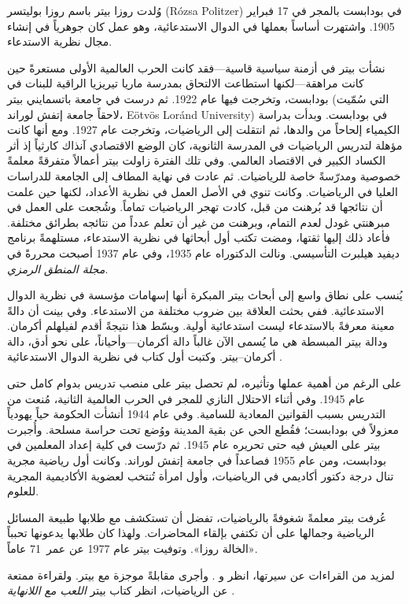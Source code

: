 \documentclass[../../../include/open-logic-section]{subfiles}
\begin{document}



وُلدت روزا بيتر باسم روزا بوليتسر (R\'ozsa Politzer) في بودابست بالمجر
في 17 فبراير 1905. واشتهرت أساساً بعملها في الدوال الاستدعائية، وهو عمل
كان جوهرياً في إنشاء مجال نظرية الاستدعاء.

نشأت بيتر في أزمنة سياسية قاسية---فقد كانت الحرب العالمية الأولى مستعرةً
حين كانت مراهقة---لكنها استطاعت الالتحاق بمدرسة ماريا تيريزيا الراقية
للبنات في بودابست، وتخرجت فيها عام 1922. ثم درست في جامعة باتسمايني بيتر
(التي سُمّيت لاحقاً جامعة إتفش لوراند، E\"otv\"os Lor\'and University)
في بودابست. وبدأت بدراسة الكيمياء إلحاحاً من والدها، ثم انتقلت إلى
الرياضيات، وتخرجت عام 1927. ومع أنها كانت مؤهلة لتدريس الرياضيات في
المدرسة الثانوية، كان الوضع الاقتصادي آنذاك كارثياً إذ أثر الكساد الكبير
في الاقتصاد العالمي. وفي تلك الفترة زاولت بيتر أعمالاً متفرقةً معلمةً
خصوصية ومدرّسةً خاصة للرياضيات. ثم عادت في نهاية المطاف إلى الجامعة
للدراسات العليا في الرياضيات. وكانت تنوي في الأصل العمل في نظرية الأعداد،
لكنها حين علمت أن نتائجها قد بُرهنت من قبل، كادت تهجر الرياضيات تماماً.
وشُجعت على العمل في مبرهنتي غودل لعدم التمام، وبرهنت من غير أن تعلم عدداً
من نتائجه بطرائق مختلفة. فأعاد ذلك إليها ثقتها، ومضت تكتب أول أبحاثها في
نظرية الاستدعاء، مستلهمةً برنامج ديفيد هيلبرت التأسيسي. ونالت الدكتوراه
عام 1935، وفي عام 1937 أصبحت محررةً في \emph{مجلة المنطق الرمزي}.

يُنسب على نطاق واسع إلى أبحاث بيتر المبكرة أنها إسهامات مؤسسة في نظرية
الدوال الاستدعائية. ففي \cite{Peter1935a} بحثت العلاقة بين ضروب مختلفة
من الاستدعاء. وفي \cite{Peter1935b} بينت أن دالةً معينة معرفةً بالاستدعاء
ليست استدعائية أولية. وبسّط هذا نتيجةً أقدم لفيلهلم أكرمان. ودالة بيتر
المبسطة هي ما يُسمى الآن غالباً دالة أكرمان---وأحياناً، على نحو أدق، دالة
أكرمان--بيتر. وكتبت أول كتاب في نظرية الدوال الاستدعائية
\citep{Peter1951}.

على الرغم من أهمية عملها وتأثيره، لم تحصل بيتر على منصب تدريس بدوام كامل
حتى عام 1945. وفي أثناء الاحتلال النازي للمجر في الحرب العالمية الثانية،
مُنعت من التدريس بسبب القوانين المعادية للسامية. وفي عام 1944 أنشأت
الحكومة حياً يهودياً معزولاً في بودابست؛ فقُطع الحي عن بقية المدينة ووُضع
تحت حراسة مسلحة. وأُجبرت بيتر على العيش فيه حتى تحريره عام 1945. ثم درّست
في كلية إعداد المعلمين في بودابست، ومن عام 1955 فصاعداً في جامعة إتفش
لوراند. وكانت أول رياضية مجرية تنال درجة دكتور أكاديمي في الرياضيات، وأول
امرأة تُنتخب لعضوية الأكاديمية المجرية للعلوم.

عُرفت بيتر معلمةً شغوفةً بالرياضيات، تفضل أن تستكشف مع طلابها طبيعة
المسائل الرياضية وجمالها على أن تكتفي بإلقاء المحاضرات. ولهذا كان طلابها
يدعونها تحبباً «الخالة روزا». وتوفيت بيتر عام 1977 عن عمر~71 عاماً.

\begin{reading}
لمزيد من القراءات عن سيرتها، انظر \citep{Oconnor2014} و
\citep{Andrasfai1986}. وأجرى \citet{Tamassy1994} مقابلةً موجزة مع بيتر.
ولقراءة ممتعة عن الرياضيات، انظر كتاب بيتر \emph{اللعب مع اللانهاية}
\citep{Peter2010}.
\end{reading}
\end{document}
